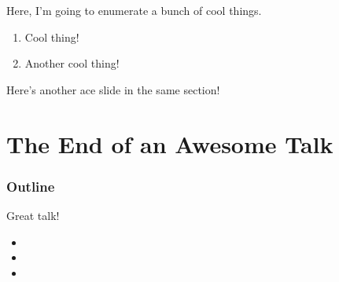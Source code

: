 \documentclass{beamer}
\begin{document}
\begin{frame}

  Here, I'm going to enumerate a bunch of cool things.

  \begin{enumerate}

    \pause
  \item Cool thing!

    \pause
  \item Another cool thing!

  \end{enumerate}

\end{frame}


\begin{frame}

  Here's another ace slide in the same section!

\end{frame}


\section{The End of an Awesome Talk}

\begin{frame}
\frametitle{Outline}
\tableofcontents[currentsection]
\end{frame}


\begin{frame}

  Great talk!

  \begin{itemize}
  \item {}
  \item {}
  \item {}
  \end{itemize}

\end{frame}
\end{document}
